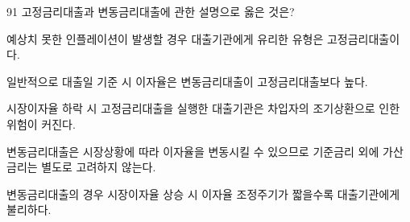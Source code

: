 \begin{question}{91}
고정금리대출과 변동금리대출에 관한 설명으로 옳은 것은?
\begin{choices}
  \item 예상치 못한 인플레이션이 발생할 경우 대출기관에게 유리한 유형은 고정금리대출이다.
  \item 일반적으로 대출일 기준 시 이자율은 변동금리대출이 고정금리대출보다 높다.
  \item 시장이자율 하락 시 고정금리대출을 실행한 대출기관은 차입자의 조기상환으로 인한 위험이 커진다.
  \item 변동금리대출은 시장상황에 따라 이자율을 변동시킬 수 있으므로 기준금리 외에 가산금리는 별도로 고려하지 않는다.
  \item 변동금리대출의 경우 시장이자율 상승 시 이자율 조정주기가 짧을수록 대출기관에게 불리하다.
\end{choices}
\end{question}
